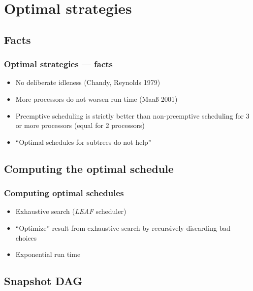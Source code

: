 \documentclass{beamer}
\begin{document}
\section{Optimal strategies}

\subsection{Facts}

\begin{frame}
  \frametitle{Optimal strategies --- facts}
  \begin{itemize}
  \item No deliberate idleness (Chandy, Reynolds 1979)
  \item More processors do not worsen run time (Maaß 2001)
  \item Preemptive scheduling is strictly better than non-preemptive scheduling for 3 or more processors (equal for 2 processors)
  \item ``Optimal schedules for subtrees do not help''
  \end{itemize}
\end{frame}

\subsection{Computing the optimal schedule}

\begin{frame}
  \frametitle{Computing optimal schedules}
  \begin{itemize}
  \item Exhaustive search (\emph{LEAF} scheduler)
  \item ``Optimize'' result from exhaustive search by recursively discarding bad choices
  \item Exponential run time
  \end{itemize}
\end{frame}

\subsection{Snapshot DAG}
\end{document}
